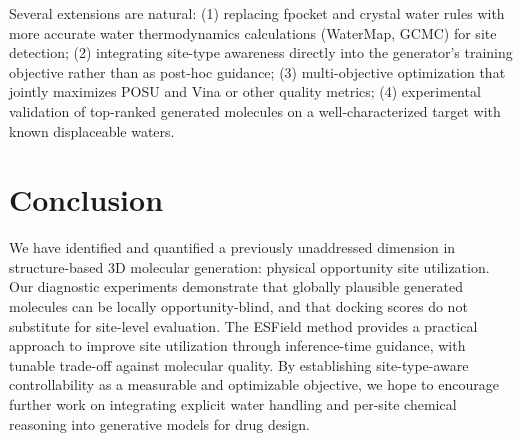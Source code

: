 \documentclass[journal=jcisd,manuscript=article]{achemso}
\begin{document}
Several extensions are natural: (1) replacing fpocket and crystal water rules
with more accurate water thermodynamics calculations (WaterMap, GCMC) for
site detection; (2) integrating site-type awareness directly into the
generator's training objective rather than as post-hoc guidance;
(3) multi-objective optimization that jointly maximizes POSU and Vina or
other quality metrics; (4) experimental validation of top-ranked generated
molecules on a well-characterized target with known displaceable waters.

\section{Conclusion}

We have identified and quantified a previously unaddressed dimension in
structure-based 3D molecular generation: physical opportunity site utilization.
Our diagnostic experiments demonstrate that globally plausible generated
molecules can be locally opportunity-blind, and that docking scores do not
substitute for site-level evaluation. The ESField method provides a practical
approach to improve site utilization through inference-time guidance, with
tunable trade-off against molecular quality. By establishing site-type-aware
controllability as a measurable and optimizable objective, we hope to
encourage further work on integrating explicit water handling and per-site
chemical reasoning into generative models for drug design.
\end{document}
